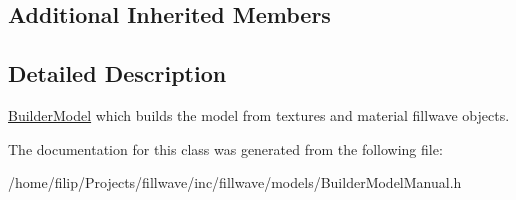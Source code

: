 \subsection*{Additional Inherited Members}


\subsection{Detailed Description}
\hyperlink{classfillwave_1_1models_1_1BuilderModel}{Builder\+Model} which builds the model from textures and material fillwave objects. 

The documentation for this class was generated from the following file\+:\begin{DoxyCompactItemize}
\item 
/home/filip/\+Projects/fillwave/inc/fillwave/models/Builder\+Model\+Manual.\+h\end{DoxyCompactItemize}
